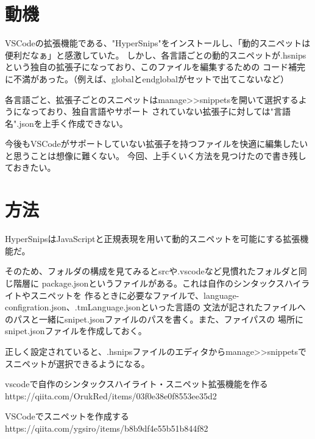\documentclass{ltjsarticle}
\begin{document}
 
\section{動機}
VSCodeの拡張機能である、"HyperSnips"をインストールし、「動的スニペットは便利だなぁ」と感激していた。
しかし、各言語ごとの動的スニペットが.hsnipsという独自の拡張子になっており、このファイルを編集するための
コード補完に不満があった。（例えば、globalとendglobalがセットで出てこないなど）\par
各言語ごと、拡張子ごとのスニペットはmanage>>snippetsを開いて選択するようになっており、独自言語やサポート
されていない拡張子に対しては"言語名".jsonを上手く作成できない。\par
今後もVSCodeがサポートしていない拡張子を持つファイルを快適に編集したいと思うことは想像に難くない。
今回、上手くいく方法を見つけたので書き残しておきたい。

\section{方法}
HyperSnipsはJavaScriptと正規表現を用いて動的スニペットを可能にする拡張機能だ。\par
そのため、フォルダの構成を見てみるとsrcや.vscodeなど見慣れたフォルダと同じ階層に
package.jsonというファイルがある。これは自作のシンタックスハイライトやスニペットを
作るときに必要なファイルで、language-configration.json、.tmLanguage.jsonといった言語の
文法が記されたファイルへのパスと一緒にsnipet.jsonファイルのパスを書く。また、ファイパスの
場所にsnipet.jsonファイルを作成しておく。\par
正しく設定されていると、.hsnipsファイルのエディタからmanage>>snippetsでスニペットが選択できるようになる。





\begin{thebibliography}{9}
  vscodeで自作のシンタックスハイライト・スニペット拡張機能を作る\\
  https://qiita.com/OrukRed/items/03f0e38e0f8553ee35d2

  VSCodeでスニペットを作成する\\
  https://qiita.com/ygsiro/items/b8b9df4e55b51b844f82

\end{thebibliography}
\end{document}
